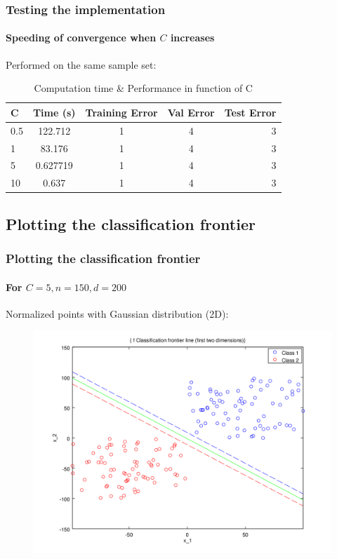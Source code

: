 \documentclass{beamer}
\begin{document}
\begin{frame}
\frametitle{Testing the implementation}
\framesubtitle{Speeding of convergence when $C$ increases}

Performed on the same sample set:\\

                \begin{table}
                \centering
                \caption{Computation time \& Performance in function of C}
                \begin{tabular}{| l | c | c | c | r |}
                \hline
               C  & Time (s) & Training Error & Val Error & Test Error\\ \hline
               0.5 & 122.712 & 1 & 4 & 3\\ \hline
               1  & 83.176 & 1 & 4 & 3\\ \hline
               5  & 0.627719 & 1 & 4 & 3  \\ \hline
               10 & 0.637 & 1 & 4 & 3\\ \hline
                \end{tabular}
                \end{table}

\end{frame}

\subsection{Plotting the classification frontier}

\begin{frame}
\tableofcontents[currentsubsection]
\end{frame}

\begin{frame}
\frametitle{Plotting the \textbf{classification frontier}}
\framesubtitle{For $C = 5, n = 150, d = 200$}

Normalized points with Gaussian distribution (2D):

         \begin{figure}
         \centering
         \includegraphics[scale=0.4]{images/line4.png}
         \end{figure}

\end{frame}
\end{document}
